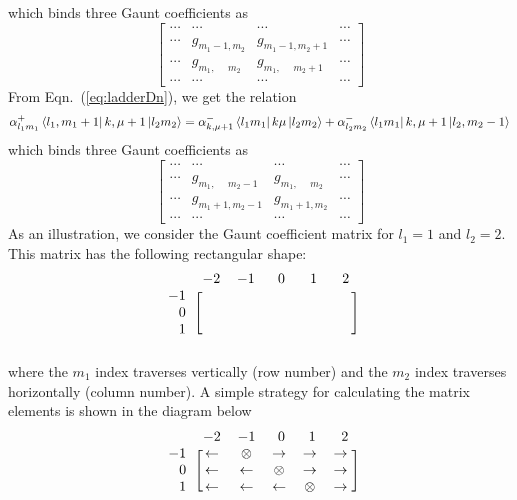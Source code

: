which binds three Gaunt coefficients as
\begin{equation*}
\begin{bmatrix}
\cdots & \cdots & \cdots & \cdots \\
\cdots & \boxed{g_{m_1-1,m_2}} & g_{m_1-1,m_2+1} & \cdots \\
\cdots & \boxed{g_{m_1,\phantom{-1}m_2}} & \boxed{g_{m_1,\phantom{-1}m_2+1}} & \cdots \\
\cdots & \cdots & \cdots & \cdots
\end{bmatrix}
\end{equation*}
%
From Eqn.~(\ref{eq:ladderDn}), we get the relation
\begin{equation} \label{eq:ldDn}
\alpha_{l_1m_1}^+ \Bra{l_1,m_1+1} k,\mu+1 \Ket{l_2m_2} =
\alpha_{k,\mu+1}^- \Bra{l_1m_1} k\mu \Ket{l_2m_2} + \alpha_{l_2m_2}^- \Bra{l_1m_1} k,\mu+1 \Ket{l_2,m_2-1}
\end{equation}
which binds three Gaunt coefficients as
\begin{equation*}
\begin{bmatrix}
\cdots & \cdots & \cdots & \cdots \\
\cdots & \boxed{g_{m_1,\phantom{+1}m_2-1}} & \boxed{g_{m_1,\phantom{+1}m_2}} & \cdots \\
\cdots & g_{m_1+1,m_2-1} & \boxed{g_{m_1+1,m_2}} & \cdots \\
\cdots & \cdots & \cdots & \cdots
\end{bmatrix}
\end{equation*}
%
As an illustration, we consider the Gaunt coefficient matrix for $l_1=1$ and
$l_2=2$. This matrix has the following rectangular shape:
\begin{equation*}
\begin{blockarray}{cccccc}
  & -2 & -1 & \ 0 & \ 1 & \ 2 \\
\begin{block}{c[ccccc]}
 -1 & \ \phantom{0,} & \ \phantom{0,} & \ \phantom{0,} & \ \phantom{0,} & \ \phantom{0,} \\
\phantom{-}0 &  &  &  &  &  \\
\phantom{-}1 &  &  &  &  &  \\
\end{block}
\end{blockarray}
\end{equation*}
where the $m_1$ index traverses vertically (row number) and the $m_2$ index
traverses horizontally (column number). A simple strategy for calculating the matrix
elements is shown in the diagram below
\begin{equation*}
\begin{blockarray}{cccccc}
  & -2 & -1 & \ 0 & \ 1 & \ 2 \\
\begin{block}{c[ccccc]}
 -1 & \leftarrow & \otimes & \rightarrow & \rightarrow & \rightarrow \\
\phantom{-}0 & \leftarrow & \leftarrow & \otimes & \rightarrow & \rightarrow \\
\phantom{-}1 & \leftarrow & \leftarrow & \leftarrow & \otimes & \rightarrow \\
\end{block}
\end{blockarray}
\end{equation*}
